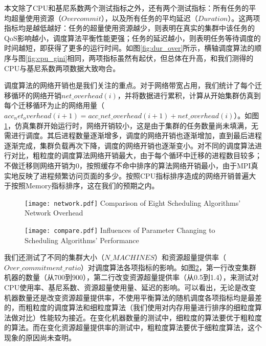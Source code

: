 本文除了CPU和基尼系数两个测试指标之外，还有两个测试指标：所有任务的平均超量使用资源（$Overcommit$），以及所有任务的平均延迟（$Duration$）。这两项指标均是越低越好：任务的超量使用资源越少，则表明在真实的集群中该任务的QoS影响越小，调度算法平衡性能更强；任务的延迟越小，则表明任务等待调度的时间越短，即获得了更多的运行时间。如图\ref{fig:dur_over}所示，横轴调度算法的顺序与图\ref{fig:cpu_gini}相同，两项指标虽然有起伏，但总体在升高，和我们测得的CPU与基尼系数两项数据大致吻合。

调度算法的网络开销也是我们关注的重点。对于网络带宽占用，我们统计了每个迁移循环的网络开销$net\_overhead(i)$，并将数据进行累积，计算从开始集群仿真到每个迁移循环为止的网络用量（$acc_net_overhead(i+1)=acc\_net\_overhead(i+1)+net\_overhead(i)$）。如图\ref{fig:minetwork}，仿真集群开始运行时，网络开销较小，这是由于集群的任务数量尚未填满，无需进行调度。其后进程数量逐渐增多，调度的网络开销也逐渐增加，直到最后进程逐渐完成，集群负载再次下降，调度的网络开销也逐渐变小。对不同的调度算法进行对比，粗粒度的调度算法网络开销最大，由于每个循环中迁移的进程数目较多；不做迁移则网络开销为0，按照缓存不命中排序的算法网络开销最小，由于MPI真实地反映了进程频繁访问页面的多少。按照CPU指标排序造成的网络开销普遍大于按照Memory指标排序，这在我们的预期之内。
\begin{figure}[!htp]
  \centering
  \texttt{[image: network.pdf]}
    {Comparison of Eight Scheduling Algorithms' Network Overhead}
  \label{fig:minetwork}
\end{figure}

\begin{figure}[!htp]
  \centering
  \texttt{[image: compare.pdf]}
    {Influences of Parameter Changing to Scheduling Algorithms' Performance}
  \label{fig:comparing}
\end{figure}

我们还测试了不同的集群大小（$N\_MACHINES$）和资源超量提供率（$Over\_commitment\_ratio$）对调度算法各项指标的影响。如图\ref{fig:comparing}，第一行改变集群机器的数量（从700到900），第二行改变资源超量提供率（从0.5到1.4），来测试对CPU使用率、基尼系数、资源超量使用量、延迟的影响。可以看出，无论是改变机器数量还是改变资源超量提供率，不使用平衡算法的随机调度各项指标均是最差的，而粗粒度的调度算法和细粒度算法（我们使用对内存用量进行排序的细粒度算法做对比）性能较为接近。在变化机器数量的测试中，细粒度的算法要优于粗粒度的算法。而在变化资源超量提供率的测试中，粗粒度算法要优于细粒度算法，这个现象的原因尚未查明。

